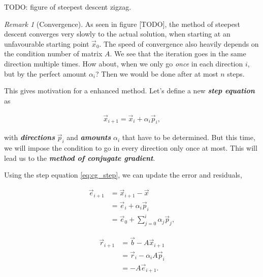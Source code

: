 \documentclass{article}
\theoremstyle{plain} %
\theoremstyle{convention} %
\theoremstyle{remark} %
\newtheorem*{remark}{Remark} %
\def\df#1{\textbf{\textit{#1}}}
\numberwithin{equation}{section}
\begin{document}
TODO: figure of steepest descent zigzag.

\begin{remark}[Convergence]
As seen in figure [TODO], the method of steepest descent converges very slowly to the actual solution, when starting at an unfavourable starting point $\vec{x}_0$. The speed of convergence also heavily depends on the condition number of matrix $A$. We see that the iteration goes in the same direction multiple times. How about, when we only go \textit{once} in each direction $i$, but by the perfect amount $\alpha_i$? Then we would be done after at most $n$ steps.
\end{remark}

This gives motivation for a enhanced method. Let's define a new \df{step equation} as

\begin{align}
    \vec{x}_{i+1} = \vec{x}_i + \alpha_i \vec{p}_i, \label{eq:cg_step}
\end{align}

with \df{directions} $\vec{p}_i$ and \df{amounts} $\alpha_i$ that have to be determined. But this time, we will impose the condition to go in every direction only once at most. This will lead us to the \df{method of conjugate gradient}.

Using the step equation \eqref{eq:cg_step}, we can update the error and residuals,

\begin{subequations}
    \begin{align}
        \vec{e}_{i+1} &= \vec{x}_{i+1} - \vec{x} \\
                      &= \vec{e}_{i} + \alpha_i \vec{p}_{i} \label{eq:cg_error1} \\
                      &= \vec{e}_{0} + \sum_{j=0}^{i} \alpha_j \vec{p}_{j}, \label{eq:cg_error2}
    \end{align}
\end{subequations}

\begin{subequations}
    \begin{align}
        \vec{r}_{i+1} &= \vec{b} - A \vec{x}_{i+1} \label{eq:residual_exact} \\
                      &= \vec{r}_{i} - \alpha_i A \vec{p}_{i} \label{eq:residual_recursive} \\
                      &= - A \vec{e}_{i+1}. \label{eq:residual_exact2}
    \end{align}
\end{subequations}
\end{document}
